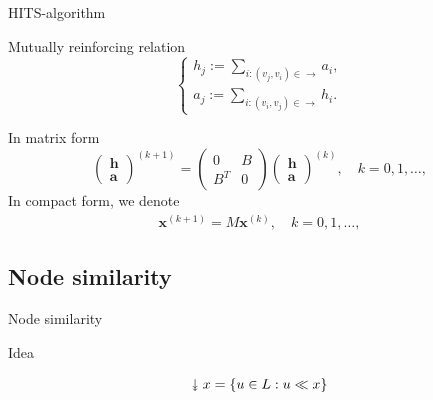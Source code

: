 \documentclass{beamer}
\newcommand{\downdownarrow}{\mathrel{\reflectbox{\rotatebox[origin=c]{90}{$\twoheadleftarrow$}}}}
\begin{document}
\begin{frame}{HITS-algorithm}

\begin{block}{Mutually reinforcing relation}
$$\begin{cases} h_j := \sum_{i:(v_j,v_i)\in \to} a_i,\\ 
a_j := \sum_{i:(v_i,v_j)\in \to} h_i.
\end{cases}$$ 
\end{block}

\begin{block}{In matrix form}
$$\begin{pmatrix} 
\textbf{h}\\
\textbf{a}
\end{pmatrix}^{(k+1)} = \begin{pmatrix} 
0 & B\\
B^T & 0
\end{pmatrix} \begin{pmatrix} 
\textbf{h}\\
\textbf{a}
\end{pmatrix}^{(k)},\quad k = 0, 1,\ldots,$$
In compact form, we denote
\begin{eqnarray}\label{compactform}
  \mathbf{x}^{(k+1)} = M\mathbf{x}^{(k)},\quad k = 0, 1,\ldots,
\end{eqnarray}

\end{block}
\end{frame}
\subsection{Node similarity}

\begin{frame}{Node similarity}


\begin{block}{Idea}
\begin{center}
\end{center}
\end{block}

\begin{block}{}
$$\downdownarrow x = \{u \in L: u \ll x\}$$
\end{block}
\end{frame}
\end{document}
